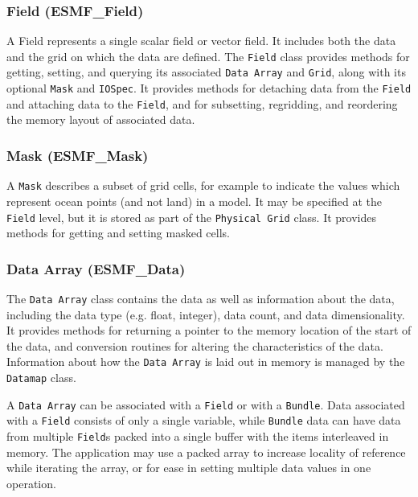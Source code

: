 \subsubsection{Field (ESMF\_Field)}
\label{sec:field} 
A Field represents a single scalar field or vector field.  It includes 
both the data and the grid on which the data are defined.  The {\tt Field}
 class provides
methods for getting, setting, and querying its associated {\tt Data Array} and {\tt Grid},
along with its optional {\tt Mask} and {\tt IOSpec}.  It provides methods for detaching 
data from the {\tt Field} and attaching data to the {\tt Field}, and for subsetting, 
regridding, and reordering the memory layout of associated data.

\subsubsection{Mask (ESMF\_Mask)}
\label{sec:mask} 
A {\tt Mask} describes a subset of grid cells, for example to indicate
the values which represent ocean points (and not land) in a model.  
It may be specified at the {\tt Field} level, but it is stored as part 
of the {\tt Physical Grid} class.  It provides methods for getting 
and setting masked cells.

\subsubsection{Data Array (ESMF\_Data)}
\label{sec:dataarray} 
The {\tt Data Array} class contains the data as well as information 
about the data, including the data type (e.g. float,
integer), data count, and data dimensionality.  
It provides methods for returning a pointer to the memory 
location of the start of the data, and conversion routines 
for altering the characteristics of the data.  
Information about how the {\tt Data Array} is laid
out in memory is managed by the {\tt Datamap} class.

A {\tt Data Array} can be associated with a {\tt Field} or with a {\tt Bundle}.
Data associated with a {\tt Field} consists of only a single variable,
while {\tt Bundle} data can have data from multiple {\tt Field}s packed 
into a single buffer with the items interleaved in memory.  
The application may use a packed array to increase
locality of reference while iterating the array, 
or for ease in setting multiple data values in one operation.


